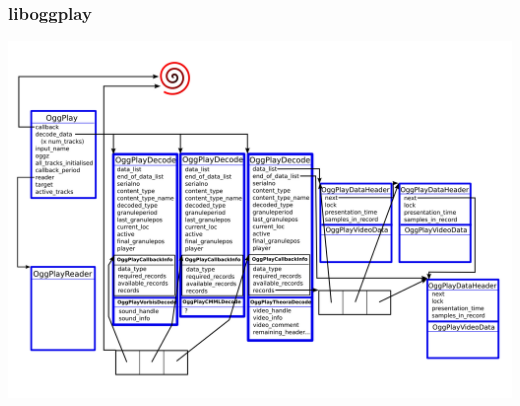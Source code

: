 \subsubsection{liboggplay}
{
\begin{center}
\includegraphics[width=15cm]{data/liboggplay_data_layout.png}
\end{center}
}

